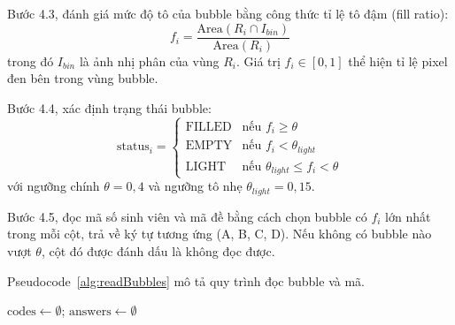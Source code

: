 ﻿\documentclass[../DoAn.tex]{subfiles}
\begin{document}
Bước 4.3, đánh giá mức độ tô của bubble bằng công thức tỉ lệ tô đậm (fill ratio):
\begin{equation}
    f_i = \frac{\text{Area}(R_i \cap I_{bin})}{\text{Area}(R_i)}
\end{equation}
trong đó $I_{bin}$ là ảnh nhị phân của vùng $R_i$. Giá trị $f_i \in [0,1]$ thể hiện tỉ lệ pixel đen bên trong vùng bubble.

Bước 4.4, xác định trạng thái bubble:
\begin{equation}
    \text{status}_i = 
    \begin{cases}
        \text{FILLED} & \text{nếu } f_i \ge \theta \\
        \text{EMPTY} & \text{nếu } f_i < \theta_{light} \\
        \text{LIGHT} & \text{nếu } \theta_{light} \le f_i < \theta
    \end{cases}
\end{equation}
với ngưỡng chính $\theta = 0{,}4$ và ngưỡng tô nhẹ $\theta_{light} = 0{,}15$.

Bước 4.5, đọc mã số sinh viên và mã đề bằng cách chọn bubble có $f_i$ lớn nhất trong mỗi cột, trả về ký tự tương ứng (A, B, C, D). Nếu không có bubble nào vượt $\theta$, cột đó được đánh dấu là không đọc được.

Pseudocode~\ref{alg:readBubbles} mô tả quy trình đọc bubble và mã.

\begin{algorithm}[H]
\caption{Phát hiện bubble và đọc mã}
\label{alg:readBubbles}
\SetAlgoLined
{}
 $\text{codes} \gets \emptyset$; $\text{answers} \gets \emptyset$ \;
  \;
\end{algorithm}
\end{document}
